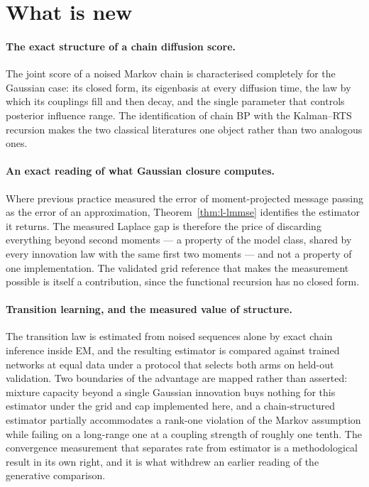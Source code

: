\section{What is new}

\paragraph{The exact structure of a chain diffusion score.} The joint score of a
noised Markov chain is characterised completely for the Gaussian case: its
closed form, its eigenbasis at every diffusion time, the law by which its
couplings fill and then decay, and the single parameter that controls posterior
influence range. The identification of chain BP with the Kalman--RTS recursion
makes the two classical literatures one object rather than two analogous ones.

\paragraph{An exact reading of what Gaussian closure computes.} Where previous
practice measured the error of moment-projected message passing as the error of
an approximation, Theorem~\ref{thm:l-lmmse} identifies the estimator it returns.
The measured Laplace gap is therefore the price of discarding everything beyond
second moments --- a property of the model class, shared by every innovation law
with the same first two moments --- and not a property of one implementation.
The validated grid reference that makes the measurement possible is itself a
contribution, since the functional recursion has no closed form.

\paragraph{Transition learning, and the measured value of structure.} The
transition law is estimated from noised sequences alone by exact chain inference
inside EM, and the resulting estimator is compared against trained networks at
equal data under a protocol that selects both arms on held-out validation. Two
boundaries of the advantage are mapped rather than asserted: mixture capacity
beyond a single Gaussian innovation buys nothing for this estimator under the
grid and cap implemented here, and a chain-structured estimator partially
accommodates a rank-one violation of the Markov assumption while failing on a
long-range one at a coupling strength of roughly one tenth. The convergence
measurement that separates rate from estimator is a methodological result in its
own right, and it is what withdrew an earlier reading of the generative
comparison.

